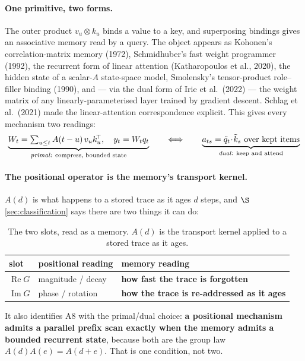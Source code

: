 \documentclass[11pt]{article}
\begin{document}
\paragraph{One primitive, two forms.} The outer product $v_u \otimes k_u$ binds a
value to a key, and superposing bindings gives an associative memory read by a
query. The object appears as Kohonen's correlation-matrix memory (1972),
Schmidhuber's fast weight programmer (1992), the recurrent form of linear attention
(Katharopoulos et al., 2020), the hidden state of a scalar-$A$ state-space model,
Smolensky's tensor-product role--filler binding (1990), and --- via the dual form of
Irie et al.\ (2022) --- the weight matrix of any linearly-parameterised layer trained
by gradient descent. Schlag et al.\ (2021) made the linear-attention correspondence
explicit. This gives every mechanism two readings:
\[
  \underbrace{W_t = \textstyle\sum_{u\le t} A(t-u)\,v_u k_u^{\!\top},\quad y_t = W_tq_t}_{\text{\emph{primal}: compress, bounded state}}
  \qquad\Longleftrightarrow\qquad
  \underbrace{a_{ts} = \tilde q_t\!\cdot\!\tilde k_s \text{ over kept items}}_{\text{\emph{dual}: keep and attend}}
\]

\paragraph{The positional operator is the memory's transport kernel.} $A(d)$ is what
happens to a stored trace as it ages $d$ steps, and $\S$\ref{sec:classification}
says there are two things it can do:
\begin{table}[htbp]\centering\small
\caption{The two slots, read as a memory. $A(d)$ is the transport kernel applied to a stored trace as it ages.}
\label{tab:memory}
\begin{tabular}{@{}lll@{}}
\toprule
slot & positional reading & memory reading \\
\midrule
$\operatorname{Re}G$ & magnitude / decay & \textbf{how fast the trace is forgotten} \\
$\operatorname{Im}G$ & phase / rotation  & \textbf{how the trace is re-addressed as it ages} \\
\bottomrule
\end{tabular}
\end{table}

\noindent It also identifies A8 with the primal/dual choice: \textbf{a positional
mechanism admits a parallel prefix scan exactly when the memory admits a bounded
recurrent state}, because both are the group law $A(d)A(e) = A(d+e)$. That is one
condition, not two.
\end{document}
